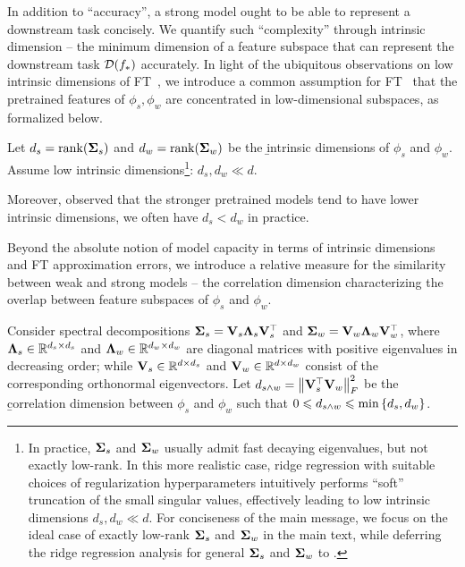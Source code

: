 In addition to ``accuracy'', a strong model ought to be able to represent a downstream task concisely. We quantify such ``complexity'' through intrinsic dimension -- the minimum dimension of a feature subspace that can represent the downstream task $\mathcal{D}(f_*)$ accurately. In light of the ubiquitous observations on low intrinsic dimensions of FT~\citep{aghajanyan2020intrinsic}, we introduce a common assumption for FT~\citep{xia2024less,dong2024sketchy} that the pretrained features of $\phi_s, \phi_w$ are concentrated in low-dimensional subspaces, as formalized below.
\begin{definition}\label{def:low_intrinsic_dim}
    Let $d_s = \mathop{\mathrm{rank}}(\boldsymbol{\Sigma}_s)$ and $d_w = \mathop{\mathrm{rank}}(\boldsymbol{\Sigma}_w)$ be the \b{intrinsic dimensions} of $\phi_s$ and $\phi_w$. Assume low intrinsic dimensions\footnote{\label{fn:ridge_regression}
        In practice, $\boldsymbol{\Sigma}_s$ and $\boldsymbol{\Sigma}_w$ usually admit fast decaying eigenvalues, but not exactly low-rank. In this more realistic case, ridge regression with suitable choices of regularization hyperparameters intuitively performs ``soft'' truncation of the small singular values, effectively leading to low intrinsic dimensions $d_s, d_w \ll d$. 
        For conciseness of the main message, we focus on the ideal case of exactly low-rank $\boldsymbol{\Sigma}_s$ and $\boldsymbol{\Sigma}_w$ in the main text, while deferring the ridge regression analysis for general $\boldsymbol{\Sigma}_s$ and $\boldsymbol{\Sigma}_w$ to .
    }: $d_s, d_w \ll d$.
\end{definition}
Moreover, \citet{aghajanyan2020intrinsic} observed that the stronger pretrained models tend to have lower intrinsic dimensions, \ie we often have $d_s < d_w$ in practice.

Beyond the absolute notion of model capacity in terms of intrinsic dimensions and FT approximation errors, we introduce a relative measure for the similarity between weak and strong models -- the correlation dimension characterizing the overlap between feature subspaces of $\phi_s$ and $\phi_w$.
\begin{definition}\label{def:correlation_dim}
    Consider spectral decompositions $\boldsymbol{\Sigma}_s = \mathbf{V}_s \boldsymbol{\Lambda}_s \mathbf{V}_s^\top$ and $\boldsymbol{\Sigma}_w = \mathbf{V}_w \boldsymbol{\Lambda}_w \mathbf{V}_w^\top$, where $\boldsymbol{\Lambda}_s \in \mathbb{R}^{d_s \times d_s}$ and $\boldsymbol{\Lambda}_w \in \mathbb{R}^{d_w \times d_w}$ are diagonal matrices with positive eigenvalues in decreasing order; while $\mathbf{V}_s \in \mathbb{R}^{d \times d_s}$ and $\mathbf{V}_w \in \mathbb{R}^{d \times d_w}$ consist of the corresponding orthonormal eigenvectors.
    Let $d_{s \wedge w} = \left\|\mathbf{V}_s^\top \mathbf{V}_w\right\|_F^2$ be the \b{correlation dimension} between $\phi_s$ and $\phi_w$ such that $0 \leqslant d_{s \wedge w} \leqslant \min\left\{d_s, d_w\right\}$.
\end{definition}

